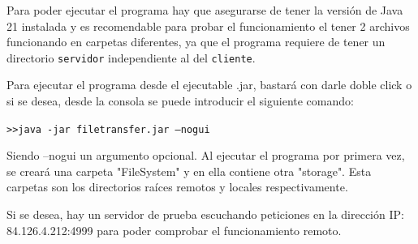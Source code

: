 \documentclass[a4paper, 12pt]{report}
\begin{document}
Para poder ejecutar el programa hay que asegurarse de tener la versión de Java 21 instalada y es recomendable para probar el funcionamiento el tener 2 archivos funcionando en carpetas diferentes, ya que el programa requiere de tener un directorio \texttt{servidor} independiente al del \texttt{cliente}.

Para ejecutar el programa desde el ejecutable .jar, bastará con darle doble click o si se desea, desde la consola se puede introducir el siguiente comando:

\texttt{\textgreater\textgreater java -jar filetransfer.jar --nogui}

Siendo --nogui un argumento opcional.
Al ejecutar el programa por primera vez, se creará una carpeta "FileSystem" y en ella contiene otra "storage".
Esta carpetas son los directorios raíces remotos y locales respectivamente.

Si se desea, hay un servidor de prueba escuchando peticiones en la dirección IP: 84.126.4.212:4999 para poder comprobar el funcionamiento remoto.

\printbibliography
\end{document}
